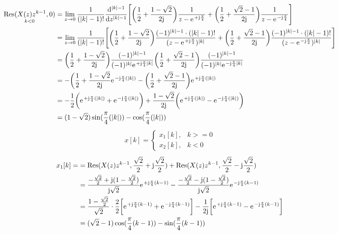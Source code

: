 \documentclass[11pt,a4paper,DIV=12]{scrartcl}
\begin{document}
\begin{align}
	\underset{k<0}{\mathrm{Res}(X(z)z^{k-1},0)}&=\lim\limits_{z\rightarrow0}\frac{1}{(|k|-1)!}\frac{\mathrm{d}^{|k|-1}}{\mathrm{d}z^{|k|-1}}\Bigg[\bigg(\frac{1}{2}+\frac{1-\sqrt{2}}{2\im}\bigg)\frac{1}{z-\e^{+\im\frac{\pi}{4}}}+\bigg(\frac{1}{2}+\frac{\sqrt{2}-1}{2\im}\bigg)\frac{1}{z-\e^{-\im\frac{\pi}{4}}}\Bigg ]\nonumber\\
	&=\lim\limits_{z\rightarrow0}\frac{1}{(|k|-1)!}\Bigg[\bigg( \frac{1}{2}+\frac{1-\sqrt{2}}{2\im}\bigg)\frac{(-1)^{|k|-1}\cdot(|k|-1)!}{(z-\e^{+\im\frac{\pi}{4}})^{|k|}}+\bigg(\frac{1}{2}+\frac{\sqrt{2}-1}{2\im}\bigg)\frac{(-1)^{|k|-1}\cdot(|k|-1)!}{(z-\e^{-\im\frac{\pi}{4}})^{|k|}}\Bigg] \nonumber\\
	&=\bigg(\frac{1}{2}+\frac{1-\sqrt{2}}{2\im}\bigg)\frac{(-1)^{|k|-1}}{(-1)^{|k|}\e^{+\im\frac{\pi}{4}|k|}}\bigg(\frac{1}{2}+\frac{\sqrt{2}-1}{2\im}\bigg)\frac{(-1)^{|k|-1}}{(-1)^{|k|}\e^{-\im\frac{\pi}{4}|k|}}\nonumber\\
	&=-\bigg(\frac{1}{2}+\frac{1-\sqrt{2}}{2\im}\e^{-\im\frac{\pi}{4}(|k|)}-\bigg(\frac{1}{2}+\frac{\sqrt{2}-1}{2\im}\bigg)\e^{+\im\frac{\pi}{4}(|k|)}\nonumber\\
	&=-\frac{1}{2}\bigg(\e^{+\im\frac{\pi}{4}(|k|)}+\e^{-\im\frac{\pi}{4}(|k|)}\bigg)+\frac{1-\sqrt{2}}{2\im}\bigg(\e^{+\im\frac{\pi}{4}(|k|)}-\e^{-\im\frac{\pi}{4}(|k|)}\bigg) \nonumber\\
	&=(1-\sqrt{2})\sin(\frac{\pi}{4}(|k|))-\cos(\frac{\pi}{4}(|k|))
\end{align}
\begin{align}
	x[k]=\begin{cases}
		x_1[k], &k>=0\\
		x_2[k], &k<0
	\end{cases}
\end{align}
\begin{align}
	x_1[k]=&=\mathrm{Res}(X(z)z^{k-1},\frac{\sqrt{2}}{2}+\im\frac{\sqrt{2}}{2})+\mathrm{Res}(X(z)z^{k-1},\frac{\sqrt{2}}{2}-\im\frac{\sqrt{2}}{2})\nonumber\\
	&=\frac{-\frac{\sqrt{2}}{2}+\im(1-\frac{\sqrt{2}}{2})}{\im\sqrt{2}}\e^{+\im\frac{\pi}{4}(k-1)}-\frac{-\frac{\sqrt{2}}{2}-\im(1-\frac{\sqrt{2}}{2})}{\im\sqrt{2}}\e^{-\im\frac{\pi}{4}(k-1)}\nonumber\\
	&=\frac{1-\frac{\sqrt{2}}{2}}{\sqrt{2}}\cdot\frac{2}{2}\bigg[\e^{+\im\frac{\pi}{4}(k-1)}+\e^{-\im\frac{\pi}{4}(k-1)}\bigg ]-\frac{1}{2\im}\bigg[\e^{+\im\frac{\pi}{4}(k-1)}-\e^{-\im\frac{\pi}{4}(k-1)}\bigg]\nonumber\\
	&=(\sqrt{2}-1)\cos(\frac{\pi}{4}(k-1))-\sin(\frac{\pi}{4}(k-1))
\end{align}
\end{document}
